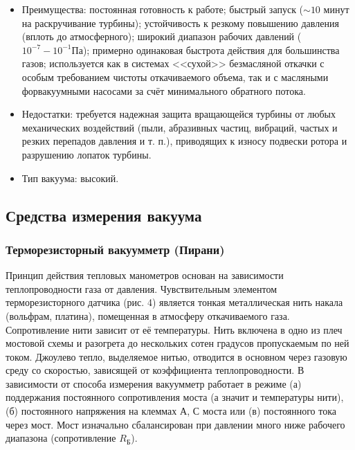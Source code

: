 \documentclass[a4paper,12pt]{article}
\theoremstyle{plain} %
\theoremstyle{definition} %
\theoremstyle{remark} %
\begin{document}
\begin{itemize}
	\item Преимущества: постоянная готовность к работе; быстрый запуск ($\sim 10$ минут на раскручивание турбины); устойчивость к резкому повышению давления (вплоть до атмосферного); широкий диапазон рабочих давлений ($10^{-7} - 10^{-1}\text{Па}$); примерно одинаковая быстрота действия для большинства газов; используется как в системах <<сухой>> безмасляной откачки с особым требованием чистоты откачиваемого объема, так и с масляными форвакуумными насосами за счёт минимального обратного потока.
	\item Недостатки: требуется надежная защита вращающейся турбины от любых механических воздействий (пыли, абразивных частиц, вибраций, частых и резких перепадов давления и т. п.), приводящих к износу подвески ротора и разрушению лопаток турбины.
	\item Тип вакуума: высокий.
\end{itemize}
\subsection{Средства измерения вакуума}
\subsubsection{Терморезисторный вакуумметр (Пирани)}
Принцип действия тепловых манометров основан на зависимости теплопроводности газа от давления. Чувствительным элементом терморезисторного датчика (рис. 4) является тонкая металлическая нить накала (вольфрам, платина), помещенная в атмосферу откачиваемого газа. Сопротивление нити зависит от её температуры. Нить включена в одно из плеч мостовой схемы и разогрета до нескольких сотен градусов пропускаемым по ней током. Джоулево тепло, выделяемое нитью, отводится в основном через газовую среду со скоростью, зависящей от коэффициента теплопроводности. В зависимости от способа измерения вакуумметр работает в режиме (а) поддержания постоянного сопротивления моста (а значит и температуры нити), (б) постоянного напряжения на клеммах $А$, $С$ моста или (в) постоянного тока через мост. Мост изначально сбалансирован при давлении много ниже рабочего диапазона (сопротивление $R_\text{Б}$).
\end{document}
